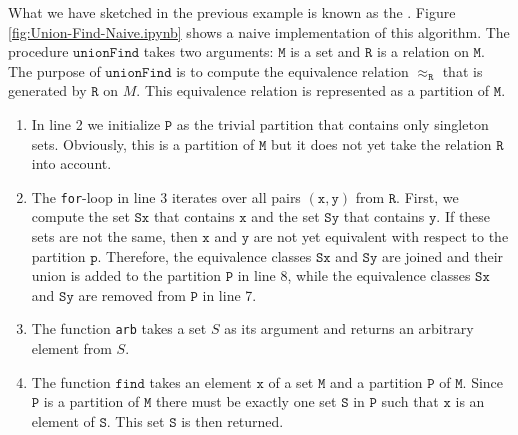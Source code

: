 What we have sketched in the previous example is known as the .
Figure \ref{fig:Union-Find-Naive.ipynb} shows a naive implementation of this algorithm.  The
procedure $\texttt{unionFind}$ takes two arguments: $\texttt{M}$ is a set and $\texttt{R}$ is a relation
on $\texttt{M}$.  The purpose of $\texttt{unionFind}$ is to compute the equivalence relation $\approx_\texttt{R}$
that is generated by $\texttt{R}$ on $M$.  This equivalence relation is represented as a partition of $\texttt{M}$.
\begin{enumerate}
\item In line 2 we initialize $\texttt{P}$ as the trivial partition that contains only singleton
      sets.  Obviously, this is a partition of $\texttt{M}$ but it does not yet take the
      relation $\texttt{R}$ into account.
\item The \texttt{for}-loop in line 3 iterates over all pairs $(\texttt{x},\texttt{y})$ from $\texttt{R}$.
      First, we compute the set $\texttt{Sx}$ that contains $\texttt{x}$ and the set $\texttt{Sy}$ that
      contains $\texttt{y}$.  If these sets are not the same, then $\texttt{x}$ and $\texttt{y}$ are not
      yet equivalent with respect to the partition $\texttt{p}$.  Therefore, the equivalence classes
      $\texttt{Sx}$ and $\texttt{Sy}$ are joined and their union is added to the partition 
      $\texttt{P}$ in line 8, while the equivalence classes $\texttt{Sx}$ and $\texttt{Sy}$ are
      removed from $\texttt{P}$ in line 7.
\item The function \texttt{arb} takes a set $S$ as its argument and returns an
      arbitrary element from $S$. 
\item The function $\texttt{find}$ takes an element $\texttt{x}$ of a set $\texttt{M}$ and a partition
      $\texttt{P}$ of $\texttt{M}$.  Since $\texttt{P}$ is a partition of $\texttt{M}$ there must be exactly
      one set $\texttt{S}$ in $\texttt{P}$ such that $\texttt{x}$ is an element of $\texttt{S}$.  This set
      $\texttt{S}$ is then returned.
\end{enumerate}

